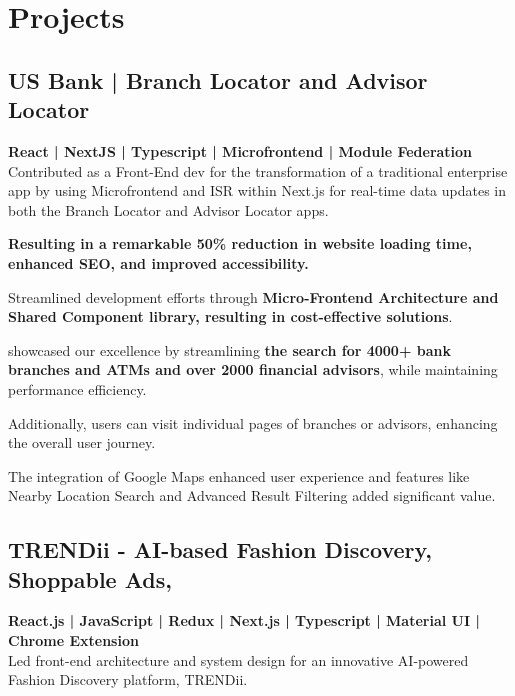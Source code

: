 \documentclass[letterpaper]{deedy-resume} %
\begin{document}
\begin{minipage}[t]{0.66\textwidth}
\sectionspace %







\section{Projects}

\subsection{US Bank | Branch Locator\href{https://www.usbank.com/locations/search/}{\faExternalLink} and Advisor Locator\href{https://www.usbank.com/wealth-management/find-an-advisor/}{\faExternalLink}}

\textbf{React | NextJS | Typescript | Microfrontend | Module Federation}  \\
Contributed as a Front-End dev for the transformation of a traditional enterprise app by using Microfrontend and ISR within Next.js for real-time data updates in both the Branch Locator and Advisor Locator apps.

\textbf{Resulting in a remarkable 50\% reduction in website loading time, enhanced SEO, and improved accessibility.}

Streamlined development efforts through \textbf{Micro-Frontend Architecture and Shared Component library, resulting in cost-effective solutions}.

showcased our excellence by
streamlining \textbf{the search for 4000+ bank branches and
ATMs and over 2000 financial advisors}, while maintaining performance efficiency.

Additionally, users can visit individual pages of branches or advisors, enhancing the overall user journey.

The integration of Google Maps enhanced user
experience and features like Nearby Location Search
and Advanced Result Filtering added significant value.


\sectionspace %

\subsection{TRENDii - AI-based Fashion Discovery, Shoppable Ads, }


\textbf{React.js | JavaScript | Redux | Next.js | Typescript | Material UI | Chrome Extension} \\
Led front-end architecture and system design for an innovative AI-powered Fashion Discovery platform, TRENDii.


\end{minipage}
\end{document}
